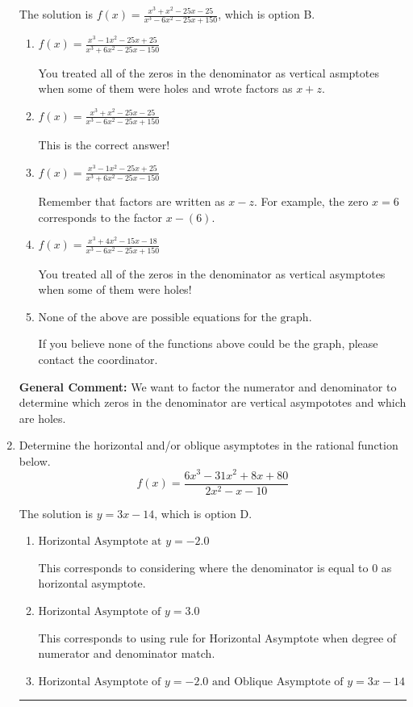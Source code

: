 \documentclass{extbook}[14pt]
\newcommand{\litem}[1]{\item #1

\rule{\textwidth}{0.4pt}}
\begin{document}
\begin{enumerate}
{The solution is \( f(x)=\frac{x^{3} + x^{2} -25 x -25}{x^{3} -6 x^{2} -25 x + 150} \), which is option B.\begin{enumerate}[label=\Alph*.]
\item \( f(x)=\frac{x^{3} -1 x^{2} -25 x + 25}{x^{3} +6 x^{2} -25 x -150} \)

You treated all of the zeros in the denominator as vertical asmptotes when some of them were holes and wrote factors as $x+z$.
\item \( f(x)=\frac{x^{3} + x^{2} -25 x -25}{x^{3} -6 x^{2} -25 x + 150} \)

This is the correct answer!
\item \( f(x)=\frac{x^{3} -1 x^{2} -25 x + 25}{x^{3} +6 x^{2} -25 x -150} \)

Remember that factors are written as $x-z$. For example, the zero $x=6$ corresponds to the factor $x-(6)$.
\item \( f(x)=\frac{x^{3} +4 x^{2} -15 x -18}{x^{3} -6 x^{2} -25 x + 150} \)

You treated all of the zeros in the denominator as vertical asymptotes when some of them were holes!
\item \( \text{None of the above are possible equations for the graph.} \)

If you believe none of the functions above could be the graph, please contact the coordinator.
\end{enumerate}

\textbf{General Comment:} We want to factor the numerator and denominator to determine which zeros in the denominator are vertical asympototes and which are holes.
}
\litem{
Determine the horizontal and/or oblique asymptotes in the rational function below.
\[ f(x) = \frac{6x^{3} -31 x^{2} +8 x + 80}{2x^{2} -x -10} \]

The solution is \( y = 3x -14 \), which is option D.\begin{enumerate}[label=\Alph*.]
\item \( \text{Horizontal Asymptote at } y = -2.0 \)

This corresponds to considering where the denominator is equal to 0 as horizontal asymptote.
\item \( \text{Horizontal Asymptote of } y = 3.0  \)

This corresponds to using rule for Horizontal Asymptote when degree of numerator and denominator match.
\item \( \text{Horizontal Asymptote of } y = -2.0 \text{ and Oblique Asymptote of } y = 3x -14 \)


\end{enumerate}}
\end{enumerate}
\end{document}

